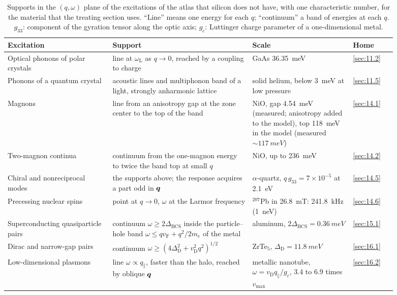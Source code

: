 \begin{table}[tbp]
  \centering
  \small
  \caption{Supports in the $(q,\omega)$ plane of the excitations of the atlas that silicon does not have, with one characteristic number, for the material that the treating section uses. ``Line'' means one energy for each $q$; ``continuum'' a band of energies at each $q$. $g_{33}$: component of the gyration tensor along the optic axis; $g_c$: Luttinger charge parameter of a one-dimensional metal.}
  \label{tab:9-supports}
  \begin{tabular}{@{}p{0.24\linewidth}p{0.32\linewidth}p{0.23\linewidth}p{0.10\linewidth}@{}}
    \toprule
    Excitation & Support & Scale & Home \\
    \midrule
    Optical phonons of polar crystals & line at $\omega_{\mathrm{L}}$ as $q \to 0$, reached by a coupling to charge & GaAs \SI{36.35}{meV} & \cref{sec:11.2} \\
    Phonons of a quantum crystal & acoustic lines and multiphonon band of a light, strongly anharmonic lattice & solid helium, below \SI{3}{meV} at low pressure & \cref{sec:11.5} \\
    Magnons & line from an anisotropy gap at the zone center to the top of the band & NiO, gap \SI{4.54}{meV} (measured; anisotropy added to the model), top \SI{118}{meV} in the model (measured ${\sim}\SI{117}{meV}$) & \cref{sec:14.1} \\
    Two-magnon continua & continuum from the one-magnon energy to twice the band top at small $q$ & NiO, up to \SI{236}{meV} & \cref{sec:14.2} \\
    Chiral and nonreciprocal modes & the supports above; the response acquires a part odd in $\bm{q}$ & $\alpha$-quartz, $q\,g_{33} = 7\times10^{-5}$ at \SI{2.1}{eV} & \cref{sec:14.5} \\
    Precessing nuclear spins & point at $q \to 0$, $\omega$ at the Larmor frequency & $^{207}$Pb in \SI{26.8}{mT}: \SI{241.8}{kHz} (\SI{1}{neV}) & \cref{sec:14.6} \\
    Superconducting quasiparticle pairs & continuum $\omega \ge 2\Delta_{\mathrm{BCS}}$ inside the particle--hole band $\omega \le qv_{\mathrm{F}} + q^2/2m_e$ of the metal & aluminum, $2\Delta_{\mathrm{BCS}} = \SI{0.36}{meV}$ & \cref{sec:15.1} \\
    Dirac and narrow-gap pairs & continuum $\omega \ge (4\Delta_{\mathrm{D}}^2 + v_{\mathrm{D}}^2q^2)^{1/2}$ & ZrTe$_5$, $\Delta_{\mathrm{D}} = \SI{11.8}{meV}$ & \cref{sec:16.1} \\
    Low-dimensional plasmons & line $\omega \propto q_\parallel$, faster than the halo, reached by oblique $\bm{q}$ & metallic nanotube, $\omega = v_{\mathrm{D}}q_\parallel/g_c$, 3.4 to 6.9 times $v_{\mathrm{max}}$ & \cref{sec:16.2} \\

\end{tabular}
\end{table}
